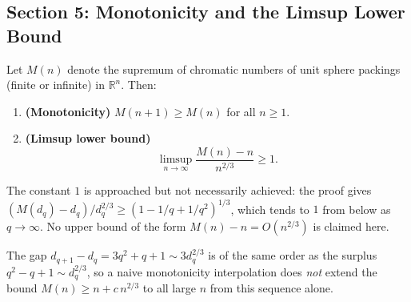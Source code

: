 \subsection*{Section 5: Monotonicity and the Limsup Lower Bound}

\begin{theorem}
\label{thm:limsup}
Let $M(n)$ denote the supremum of chromatic numbers of unit sphere packings (finite or infinite) in $\mathbb{R}^n$. Then:
\begin{enumerate}
  \item \textbf{(Monotonicity)} $M(n+1)\ge M(n)$ for all $n\ge 1$.
  \item \textbf{(Limsup lower bound)}
    \[
      \limsup_{n\to\infty}\frac{M(n)-n}{n^{2/3}}\ge 1.
    \]
\end{enumerate}
\end{theorem}

\begin{remark}
The constant $1$ is approached but not necessarily achieved: the proof gives $(M(d_q)-d_q)/d_q^{2/3} \ge (1-1/q+1/q^2)^{1/3}$, which tends to $1$ from below as $q\to\infty$.  No upper bound of the form $M(n)-n = O(n^{2/3})$ is claimed here.
\end{remark}

\begin{remark}
The gap $d_{q+1}-d_q=3q^2+q+1\sim 3d_q^{2/3}$ is of the same order as the surplus $q^2-q+1\sim d_q^{2/3}$, so a naive monotonicity interpolation does \emph{not} extend the bound $M(n)\ge n+c\,n^{2/3}$ to all large $n$ from this sequence alone.
\end{remark}

